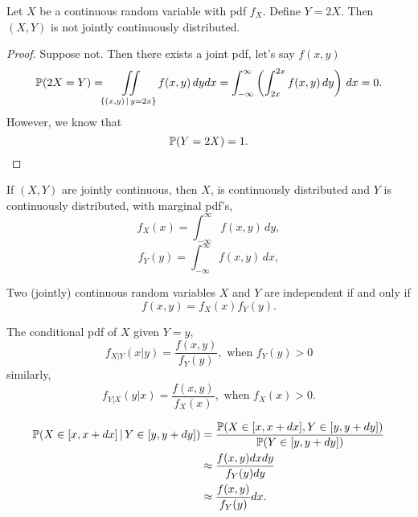 \documentclass[10pt, a4paper]{article}
\begin{document}
\begin{example}
    Let $X$ be a continuous random variable with pdf $f_X$.
    Define $Y = 2X$.
    Then $(X, Y)$ is not jointly continuously distributed.
    \begin{proof}
        Suppose not.
        Then there exists a joint pdf,
        let's say $f(x, y)$
        \[
        \P(2X = Y) = \iint\limits_{\{(x, y)\,|\,y = 2x\}}f(x, y)\,dydx = \int_{-\infty}^{\infty}\left(\int_{2x}^{2x}f(x, y)\,dy\right)\,dx = 0.
        \]
        However,
        we know that
        \[
        \P(Y = 2X) = 1.
        \]
    \end{proof}
\end{example}

\begin{theorem}
    If $(X, Y)$ are jointly continuous,
    then $X$,
    is continuously distributed and $Y$ is continuously distributed,
    with marginal pdf's,
    \[
    f_X(x) = \int_{-\infty}^{\infty}f(x, y)\,dy,
    \]
    \[
    f_Y(y) = \int_{-\infty}^{\infty}f(x, y)\,dx,
    \]
\end{theorem}

\begin{lemma}
    Two (jointly) continuous random variables $X$ and $Y$ are independent if and only if
    \[
    f(x, y) = f_X(x)f_Y(y).
    \]
\end{lemma}

The conditional pdf of $X$ given $Y = y$,
\[
f_{X | Y}(x | y) = \frac{f(x, y)}{f_Y(y)},\text{ when } f_Y(y) > 0
\]
similarly,
\[
f_{Y | X}(y | x) = \frac{f(x, y)}{f_X(x)},\text{ when } f_X(x) > 0.
\]

\begin{align*}
    \P(X \in [x, x + dx]\,|\, Y \in [y, y + dy]) &= \frac{\P(X \in [x, x + dx], Y \in [y, y + dy])}{\P(Y \in [y, y + dy])} \\
    &\approx \frac{f(x, y)dxdy}{f_Y(y)dy} \\
    &\approx \frac{f(x, y)}{f_Y(y)}dx.
\end{align*}
\end{document}
